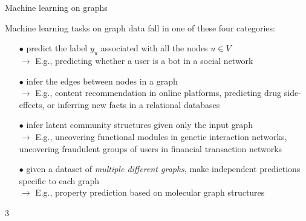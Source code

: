 \documentclass[10pt, aspectratio=169, compress, protectframetitle, handout]{beamer}
\begin{document}
\begin{frame}{Machine learning on graphs}

    Machine learning tasks on graph data fall in one of these four categories:
    \begin{itemize}[topsep=4pt,itemsep=8pt]
        \item[{$\bullet$}] { predict the label $y_u$ associated with all the nodes $u \in V$}\\
        \quad $\longrightarrow$ \; E.g., predicting whether a user is a bot in a social network
        
        \item[{$\bullet$}] {
        infer the edges between nodes in a graph}\\ 
        \quad $\longrightarrow$ \; E.g., content recommendation in online platforms, predicting drug side-effects, or inferring new facts in a relational databases
        
        \item[{$\bullet$}] { infer latent community structures given only the input graph}\\
        \quad $\longrightarrow$ \; E.g.,  uncovering functional modules in genetic interaction networks, uncovering fraudulent groups of users in financial transaction networks
        
        \item[{$\bullet$}] { given a dataset of \emph{multiple different graphs}, make independent predictions specific to each graph}\\
        \quad $\longrightarrow$ \; E.g., property prediction based on molecular graph structures 
    \end{itemize}

\end{frame}
3
\end{document}
